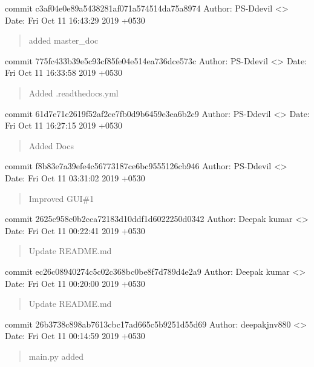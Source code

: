 \documentclass[letterpaper,10pt,english]{sphinxmanual}
\begin{document}
commit c3af04e0e89a5438281af071a574514da75a8974
Author: PS-Ddevil \textless{}\textgreater{}
Date:   Fri Oct 11 16:43:29 2019 +0530
\begin{quote}

added master\_doc
\end{quote}

commit 775fc433b39e5c93cf85fe04e514ea736dce573c
Author: PS-Ddevil \textless{}\textgreater{}
Date:   Fri Oct 11 16:33:58 2019 +0530
\begin{quote}

Added .readthedocs.yml
\end{quote}

commit 61d7e71c2619f52af2ce7fb0d9b6459e3ea6b2c9
Author: PS-Ddevil \textless{}\textgreater{}
Date:   Fri Oct 11 16:27:15 2019 +0530
\begin{quote}

Added Docs
\end{quote}

commit f8b83e7a39efe4c56773187ce6bc9555126cb946
Author: PS-Ddevil \textless{}\textgreater{}
Date:   Fri Oct 11 03:31:02 2019 +0530
\begin{quote}

Improved GUI\#1
\end{quote}

commit 2625c958c0b2cca72183d10ddf1d6022250d0342
Author: Deepak kumar \textless{}\textgreater{}
Date:   Fri Oct 11 00:22:41 2019 +0530
\begin{quote}

Update README.md
\end{quote}

commit ec26c08940274c5c02c368bc0be8f7d789d4e2a9
Author: Deepak kumar \textless{}\textgreater{}
Date:   Fri Oct 11 00:20:00 2019 +0530
\begin{quote}

Update README.md
\end{quote}

commit 26b3738c898ab7613cbc17ad665c5b9251d55d69
Author: deepakjnv880 \textless{}\textgreater{}
Date:   Fri Oct 11 00:14:59 2019 +0530
\begin{quote}

main.py added
\end{quote}
\end{document}
